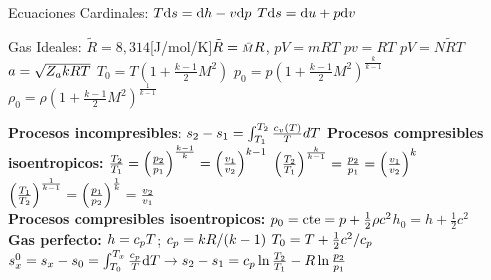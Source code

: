 \begin{formuleo}[Termodinámica]
Ecuaciones Cardinales: $T\textrm{d} s = \textrm{d} h - v \textrm{d} p$ \separar $T\textrm{d} s = \textrm{d} u +p \textrm{d} v$ \newline
\end{formuleo}

\formuleoseparator

\begin{formuleo}
Gas Ideales: $\tilde{R}=8,314 $[J/mol/K]\separar $\tilde{R}={\scriptstyle \bar{M}} R$, \molarmass [kg/mol]\separar $pV = m R T$ \separar $pv= RT$ \separar $pV = N\tilde{R}T$ \separar $a = \sqrt{Z_a k RT}$ \separar $T_{0}=T\left(1+\frac{k-1}{2} M^{2}\right)$ \separar $p_{0}=p\left(1+\frac{k-1}{2} M^{2}\right)^{\frac{k}{k-1}}$  \separar $\rho_{0}=\rho\left(1+\frac{k-1}{2} M^{2}\right)^{\frac{1}{k-1}}$ \\\newline

\textbf{Procesos incompresibles}: $s_{2}-s_{1}=\int_{T_{1}}^{T_{2}} \frac{{c_v}(T)}{T} d T$\newline
\textbf{Procesos compresibles isoentropicos:}
$\frac{T_{2}}{T_{1}}=\left(\frac{p_{2}}{p_{1}}\right)^{\frac{k-1}{k}}=\left(\frac{v_{1}}{v_{2}}\right)^{k-1}$ \separar $\left(\frac{T_{2}}{T_{1}}\right)^{\frac{k}{k-1}}=\frac{p_{2}}{p_{1}}=\left(\frac{v_{1}}{v_{2}}\right)^{k}$ \separar $\left(\frac{T_{1}}{T_{2}}\right)^{\frac{1}{k-1}}=\left(\frac{p_{1}}{p_{2}}\right)^{\frac{1}{k}}=\frac{v_{2}}{v_{1}}$ \\
\textbf{Procesos compresibles isoentropicos:} $p_0=\textrm{cte}=p+\frac{1}{2}\rho c^2$\separar $h_0=h+\frac{1}{2}c^2$ \\
\textbf{Gas perfecto:} $h={c_p} T$;  ${c_p} = k R/(k -1)$ \going $T_0=T+\frac{1}{2}c^2/{c_p} $ \separar $s_{x}^{0}=s_{x}-s_{0}=\int_{T_{0}}^{T_{x}} \frac{c_{p}}{T} \mathrm{d} T \rightarrow s_{2}-s_{1}=c_{p} \ln \frac{T_{2}}{T_{1}}-R \ln \frac{p_{2}}{p_{1}}$


\end{formuleo}

